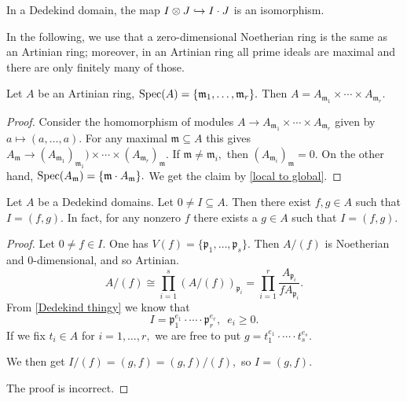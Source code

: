 \begin{note}
  In a Dedekind domain, the map \(I \otimes J \hookrightarrow I \cdot J\) is an isomorphism.
\end{note}

In the following, we use that a zero-dimensional Noetherian ring is the same as an Artinian ring; moreover, in an Artinian ring all prime ideals are maximal and there are only finitely many of those. \cite{atiyah1994introduction}

\begin{lemma}
  Let \(A\) be an Artinian ring, \(\text{Spec}(A) = \{\mathfrak m_1, \dotsc, \mathfrak m_r\}.\) Then \(A = A_{\mathfrak m_1} \times \dotsb \times A_{\mathfrak m_r}.\)
\end{lemma}
\begin{proof}
  Consider the homomorphism of modules \(A \to A_{\mathfrak m_1} \times \dotsb \times A_{\mathfrak m_r}\) given by \(a \mapsto (a, \dotsc, a).\) For any maximal \(\mathfrak m \subseteq A\) this gives \(A_{\mathfrak m} \to (A_{\mathfrak m_1})_{\mathfrak m_1}) \times \dotsb \times (A_{\mathfrak m_r})_{\mathfrak m}.\)
  If \(\mathfrak m \neq \mathfrak m_i,\) then \((A_{\mathfrak m_i})_{\mathfrak m} = 0.\)
  On the other hand,
  \(\text{Spec}(A_{\mathfrak m}) = \{\mathfrak m \cdot A_{\mathfrak m}\}.\)
  We get the claim by \cref{local to global}.
\end{proof}

\begin{theorem}
  Let \(A\) be a Dedekind domains. Let \(0 \neq I \subseteq A\). Then there exist \(f, g \in A\) such that \(I = (f, g)\). In fact, for any nonzero \(f\) there exists a \(g \in A\) such that \(I = (f, g).\)
\end{theorem}
\begin{proof}
  Let \(0 \neq f \in I.\) One has \(V(f) = \{\mathfrak p_1, \dotsc, \mathfrak p_s\}.\)
  Then \(A /{(f)}\) is Noetherian and \(0\)-dimensional, and so Artinian.
  \[A / {(f)} \cong \prod_{i=1}^s (A/{(f)})_{\mathfrak p_i} = \prod_{i=1}^r \frac{A_{\mathfrak p_i}}{f A_{\mathfrak p_i}}.\]
  From \cref{Dedekind thingy} we know that
  \[I = \mathfrak p_1^{e_1} \cdot \dotsm \cdot \mathfrak p_r^{e_r}, \enspace e_i \geq 0.\]
  If we fix \(t_i \in A\) for \(i = 1, \dotsc, r,\) we are free to put \(g = t_1^{e_1} \cdot \dotsm \cdot t_s^{e_s}.\)

  We then get \(I / {(f)} = (g, f) = (g, f)/{(f)},\) so \(I = (g, f).\)

  The proof is incorrect.
\end{proof}







